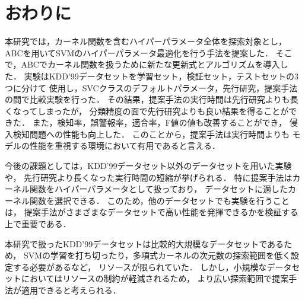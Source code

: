 \section{おわりに}
本研究では，カーネル関数を含むハイパーパラメータ全体を探索対象とし，
ABCを用いてSVMのハイパーパラメータ最適化を行う手法を提案した．
そこで，ABCでカーネル関数を扱うために新たな更新式とアルゴリズムを導入した．
実験はKDD'99データセットを学習セット，検証セット，テストセットの3つに分けて
使用し，SVCクラスのデフォルトパラメータ，先行研究，提案手法の間で比較実験を行った．
その結果，提案手法の実行時間は先行研究よりも長くなってしまったが，
分類精度の面で先行研究よりも良い結果を得ることができた．
また，検知率，誤警報率，適合率，F値の値も改善することができ，
侵入検知問題への性能も向上した．
このことから，提案手法は実行時間よりも
モデルの性能を重視する環境において有用であると言える．

今後の課題としては，KDD'99データセット以外のデータセットを用いた実験や，
先行研究より長くなった実行時間の短縮が挙げられる．
特に提案手法はカーネル関数をハイパーパラメータとして扱っており，
データセットに適したカーネル関数を選択できる．
このため，他のデータセットでも実験を行うことは，
提案手法がさまざまなデータセットで高い性能を発揮できるかを検証する上で重要である．

本研究で扱ったKDD'99データセットは比較的大規模なデータセットであるため，
SVMの学習を打ち切ったり，多項式カーネルの次元数の探索範囲を低く設定する必要があるなど，
リソースが限られていた．
しかし，小規模なデータセットにおいてはリソースの制約が軽減されるため，
より広い探索範囲で提案手法が適用できると考えられる．





